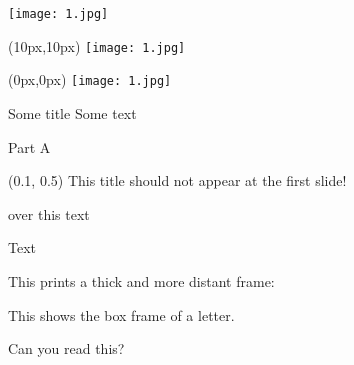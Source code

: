 \documentclass[oneside,final,12pt]{memoir}
\begin{document}


\texttt{[image: 1.jpg]}

\begin{textblock*}{\textwidth}(10px,10px)
	\texttt{[image: 1.jpg]}%
\end{textblock*}

\begin{textblock*}{\textwidth}(0px,0px)
	\texttt{[image: 1.jpg]}%
\end{textblock*}

%


\begin{frame}{Some title}
  Some text
\end{frame}

\begin{frame}[center]{Part A}
  \begin{textblock*}{300pt}(0.1\textwidth, 0.5\textheight)
    \Large
    \centering
    This title should not appear at the first slide!
  \end{textblock*}
\end{frame}

 over this text

\hspace{-15ex}

Text 

This prints a thick and more distant frame:

\setlength{\fboxsep}{10pt}
\setlength{\fboxrule}{5pt}

This shows the box frame of a letter.
%
\setlength{\fboxsep}{0pt}

\noindent
{}


\scalebox{10}{Giant}

 \par
{} \par
{} \par
{} \par
{}
Can you read this?
\end{document}
